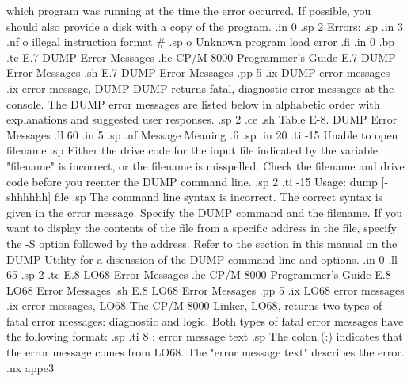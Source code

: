 which program was running at the time the error occurred.  If possible, 
you should also provide a disk with a copy of the program.
.in 0
.sp 2
Errors:
.sp
.in 3
.nf
o illegal instruction format #
.sp
o Unknown program load error
.fi
.in 0
.bp
.tc    E.7  DUMP Error Messages
.he CP/M-8000 Programmer's Guide              E.7  DUMP Error Messages
.sh
E.7  DUMP Error Messages
.pp 5
.ix DUMP error messages
.ix error message, DUMP
DUMP returns fatal, diagnostic error messages at the 
console.  The DUMP error messages are listed below in alphabetic order with
explanations and suggested user responses.
.sp 2
.ce
.sh
Table E-8.  DUMP Error Messages
.ll 60
.in 5
.sp
.nf
Message        Meaning
.fi
.sp
.in 20
.ti -15
Unable to open filename 
.sp
Either the drive code for the input file indicated by the variable
"filename" is incorrect, or the filename is misspelled.  Check the filename 
and drive code before you reenter the DUMP command line.
.sp 2
.ti -15
Usage:  dump [-shhhhhh] file
.sp
The command line syntax is incorrect.  The correct syntax is given in the 
error message.  Specify the DUMP command and the filename.  If you want to 
display the contents of the file from a specific address in the 
file, specify the -S option followed by the address.  Refer to 
the section in this manual on the DUMP Utility for a
discussion of the DUMP command line and options.
.in 0
.ll 65
.sp 2
.tc    E.8  LO68 Error Messages
.he CP/M-8000 Programmer's Guide              E.8  LO68 Error Messages
.sh
E.8  LO68 Error Messages
.pp 5
.ix LO68 error messages
.ix error messages, LO68
The CP/M-8000 Linker, LO68, returns two types of fatal error messages: 
diagnostic and logic.  Both types of fatal error 
messages have the following format:
.sp
.ti 8
:  error message text
.sp
The colon (:) indicates that the error message comes from LO68.  The "error 
message
text" describes the error.  
.nx appe3
